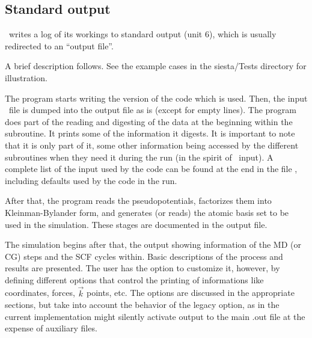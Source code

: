 \subsection{Standard output} 

\siesta\ writes a log of its workings to standard output (unit 6),
which is usually redirected to an ``output file''.

A brief description follows. See the example cases in the
siesta/Tests directory for illustration.

The program starts writing the version of the code which is
used. Then, the input \fdflib\ file is dumped into the output file as is
(except for empty lines). The program does part of the reading and
digesting of the data at the beginning within the 
subroutine. It prints some of the information it digests. It is
important to note that it is only part of it, some other information
being accessed by the different subroutines when they need it during
the run (in the spirit of \fdflib\ input).  A complete list of the input
used by the code can be found at the end in the file ,
including defaults used by the code in the run.

After that, the program reads the pseudopotentials, factorizes them
into Kleinman-Bylander form, and generates (or reads) the atomic basis
set to be used in the simulation. These stages are documented in the
output file.

The simulation begins after that, the output showing information of
the MD (or CG) steps and the SCF cycles within.  Basic descriptions of
the process and results are presented. The user has the option to
customize it, however, by defining
different options that control the printing of informations like
coordinates, forces, $\vec k$ points, etc.  The options are discussed
in the appropriate sections, but take into account the behavior of the
legacy  option, as in the current implementation might
silently activate output to the main .out file at the expense of
auxiliary files.

